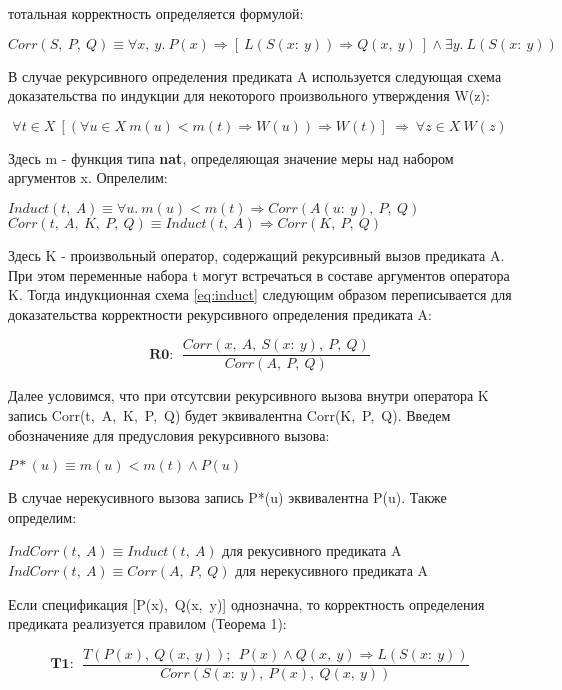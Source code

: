 \documentclass[10pt,a4paper]{article}
\newcommand{\ruleI}[3] {
$$
\mathbf{#1:} ~~
\frac{#2}{#3}
$$
}
\newcommand{\numformula}[2] {
\begin{equation}
\label{eq:#1}
#2
\end{equation}
}
\newcommand{\lnkformula}[1] {
\eqref{eq:#1}
}
\begin{document}
тотальная корректность определяется формулой:


\numformula{total_corr} {
Corr(S,~P,~Q) \equiv \forall x,~y.~P(x) \Rightarrow [~L(S(x:~y)) \Rightarrow Q(x,~y)~] \land \exists y.~L(S(x:~y))
}

В случае рекурсивного определения предиката A используется следующая схема доказательства по индукции для некоторого произвольного утверждения W(z):

\numformula{induct} {
\forall t \in X ~[(\forall u \in X~m(u)<m(t) \Rightarrow W(u)) \Rightarrow W(t)]~ \Rightarrow ~\forall z \in X ~ W(z)
}

Здесь m - функция типа \textbf{nat}, определяющая значение меры над набором аргументов x. Опрелелим:

\begin{center}
$ Induct(t,~A) \equiv \forall u.~m(u)<m(t) \Rightarrow Corr(A(u:~y),~P,~Q) $
$ Corr(t,~A,~K,~P,~Q) \equiv Induct(t,~A) \Rightarrow Corr(K,~P,~Q) $
\end{center}

Здесь K - произвольный оператор, содержащий рекурсивный вызов предиката A. При этом переменные набора t могут встречаться в составе аргументов оператора K. Тогда индукционная схема \lnkformula{induct} следующим образом переписывается для доказательства корректности рекурсивного определения предиката A:

\ruleI {R0}
{Corr(x,~A,~S(x:~y),~P,~Q)}
{Corr(A,~P,~Q)}

Далее условимся, что при отсутсвии рекурсивного вызова внутри оператора K запись Corr(t, A, K, P, Q) будет эквивалентна Corr(K, P, Q). Введем обозначенияе для предусловия рекурсивного вызова:

\begin{center}
$ P*(u) \equiv m(u)<m(t) \land P(u) $
\end{center}

В случае нерекусивного вызова запись P*(u) эквивалентна P(u). Также определим:

\begin{center}
$ IndCorr(t,~A) \equiv Induct(t,~A) $ для рекусивного предиката A
$ IndCorr(t,~A) \equiv Corr(A,~P,~Q) $ для нерекусивного предиката A
\end{center}

Если спецификация [P(x),~Q(x,~y)] однозначна, то корректность определения предиката реализуется правилом (Теорема 1):

\ruleI {T1}
{T(P(x),~Q(x,~y)); ~~P(x) \land Q(x,~y) \Rightarrow L(S(x:~y))}
{Corr(S(x:~y),~P(x),~Q(x,~y))}
\end{document}
